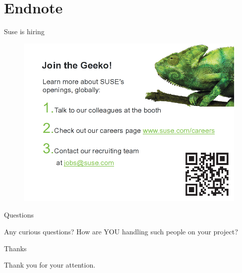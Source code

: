 \documentclass{beamer}
\begin{document}
\section{Endnote}

\begin{frame}{Suse is hiring}
	\begin{figure}
	\includegraphics[width= 0.8\linewidth]{suse_hiring.png}
	\end{figure}
\end{frame}

\begin{frame}{Questions}
	\begin{center}
	Any curious questions? How are YOU handling such people on your project?
	\end{center}
\end{frame}

\begin{frame}{Thanks}
	\begin{center}
	Thank you for your attention.
	\end{center}
\end{frame}
\end{document}
